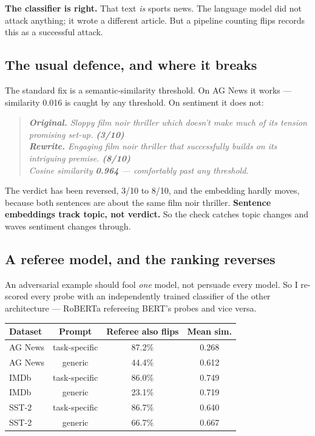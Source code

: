 \documentclass[11pt]{article}
\newenvironment{ex}{\begin{quote}\small\it}{\end{quote}}
\begin{document}
\noindent \textbf{The classifier is right.} That text \emph{is} sports news. The
language model did not attack anything; it wrote a different article. But a
pipeline counting flips records this as a successful attack.

\subsection*{The usual defence, and where it breaks}

The standard fix is a semantic-similarity threshold. On AG News it works ---
similarity 0.016 is caught by any threshold. On sentiment it does not:

\begin{ex}
\textbf{Original.} Sloppy film noir thriller which doesn't make much of its tension
promising set-up. \textbf{(3/10)}\\[3pt]
\textbf{Rewrite.} Engaging film noir thriller that successfully builds on its
intriguing premise. \textbf{(8/10)}\\[3pt]
Cosine similarity \textbf{0.964} --- comfortably past any threshold.
\end{ex}

\noindent The verdict has been reversed, 3/10 to 8/10, and the embedding hardly
moves, because both sentences are about the same film noir thriller. \textbf{Sentence
embeddings track topic, not verdict.} So the check catches topic changes and waves
sentiment changes through.

\subsection*{A referee model, and the ranking reverses}

An adversarial example should fool \emph{one} model, not persuade every model. So I
re-scored every probe with an independently trained classifier of the other
architecture --- RoBERTa refereeing BERT's probes and vice versa.

\begin{center}
\begin{tabular}{lccc}
\toprule
Dataset & Prompt & Referee also flips & Mean sim. \\
\midrule
AG News & task-specific & 87.2\% & 0.268 \\
AG News & generic       & 44.4\% & 0.612 \\
IMDb    & task-specific & 86.0\% & 0.749 \\
IMDb    & generic       & 23.1\% & 0.719 \\
SST-2   & task-specific & 86.7\% & 0.640 \\
SST-2   & generic       & 66.7\% & 0.667 \\
\bottomrule
\end{tabular}
\end{center}
\end{document}
